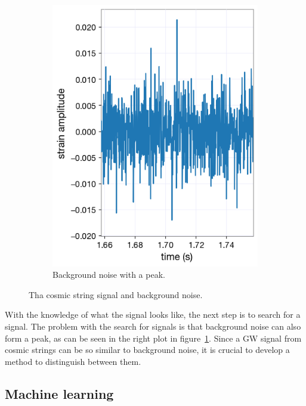 \documentclass{article}
\begin{document}
\begin{multicols}{2}
\begin{figure}[H]
\begin{subfigure}[b]{0.49\columnwidth}
        \includegraphics[width=\linewidth]{../Dataplots/background3.png}
        \caption{Background noise with a peak.}
    \end{subfigure}
    \caption{Tha cosmic string signal and background noise.}
    \label{CS_signal_and_glitch}
\end{figure}
\indent
With the knowledge of what the signal looks like, the next step is to search for a signal.
The problem with the search for signals is that background noise can also form a peak, as can be seen in the right plot in figure~\ref{CS_signal_and_glitch}.
\indent
Since a GW signal from cosmic strings can be so similar to background noise, it is crucial to develop a method to distinguish between them.

\subsection{Machine learning}




\end{multicols}
\end{document}
